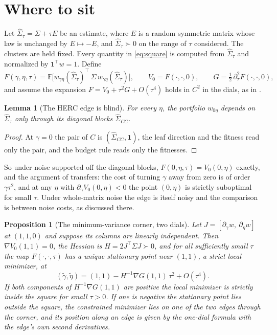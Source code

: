 \documentclass[11pt]{article}
\newcommand{\ones}{\mathbf{1}}
\newtheorem{proposition}{Proposition}
\newtheorem{lemma}{Lemma}
\begin{document}
\section{Where to sit}
\label{sec:where}

Let $\widehat\Sigma_\tau=\Sigma+\tau E$ be an estimate, where $E$ is a
random symmetric matrix whose law is unchanged by $E\mapsto-E$, and
$\widehat\Sigma_\tau\succ0$ on the range of $\tau$ considered. The clusters
are held fixed. Every quantity in \eqref{eq:square} is computed from
$\widehat\Sigma_\tau$ and normalized by $\ones^\top w=1$. Define
\begin{equation}
  F(\gamma,\eta,\tau)=\mathbb{E}\big[w_{\gamma\eta}(\widehat\Sigma_\tau)^\top
  \,\Sigma\,w_{\gamma\eta}(\widehat\Sigma_\tau)\big],
  \qquad V_0=F(\cdot,\cdot,0),
  \qquad G=\tfrac12\,\partial_\tau^2F(\cdot,\cdot,0),
  \label{eq:F}
\end{equation}
and assume the expansion $F=V_0+\tau^2G+O(\tau^4)$ holds in $C^2$ in the
dials, as in \cite{cotton2026nco}.

\begin{lemma}[The HERC edge is blind]
\label{lem:blind}
For every $\eta$, the portfolio $w_{0\eta}$ depends on
$\widehat\Sigma_\tau$ only through its diagonal blocks
$\widehat\Sigma_{CC}$.
\end{lemma}

\begin{proof}
At $\gamma=0$ the pair of $C$ is $(\widehat\Sigma_{CC},\ones)$, the leaf
direction and the fitness read only the pair, and the budget rule reads
only the fitnesses.
\end{proof}

So under noise supported off the diagonal blocks, $F(0,\eta,\tau)=V_0(0,\eta)$
exactly, and the argument of \cite{cotton2026bridge} transfers: the cost of
turning $\gamma$ away from zero is of order $\gamma\tau^2$, and at any
$\eta$ with $\partial_\gamma V_0(0,\eta)<0$ the point $(0,\eta)$ is
strictly suboptimal for small $\tau$. Under whole-matrix noise the edge is itself
noisy and the comparison is between noise costs, as discussed there.

\begin{proposition}[The minimum-variance corner, two dials]
\label{prop:corner}
Let $J=[\partial_\gamma w,\ \partial_\eta w]$ at $(1,1,0)$ and suppose its
columns are linearly independent. Then $\nabla V_0(1,1)=0$, the Hessian is
$H=2J^\top\Sigma J\succ0$, and for all sufficiently small $\tau$ the map
$F(\cdot,\cdot,\tau)$ has a unique stationary point near $(1,1)$, a strict
local minimizer, at
\begin{equation}
  (\tilde\gamma,\tilde\eta)=(1,1)-H^{-1}\nabla G(1,1)\,\tau^2+O(\tau^4).
  \label{eq:shift}
\end{equation}
If both components of $H^{-1}\nabla G(1,1)$ are positive the local
minimizer is strictly inside the square for small $\tau>0$. If one is
negative the stationary point lies outside the square, the constrained
minimizer lies on one of the two edges through the corner, and its position
along an edge is given by the one-dial formula with the edge's own second
derivatives.
\end{proposition}
\end{document}
